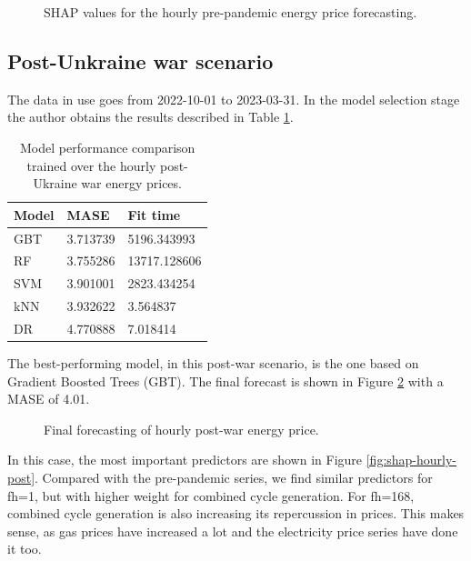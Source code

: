 \begin{figure}[H]
    \caption{SHAP values for the hourly pre-pandemic energy price forecasting.}
    \label{fig:shap-hourly-pre}
\end{figure}

\subsection{Post-Unkraine war scenario}
The data in use goes from 2022-10-01 to 2023-03-31. In the model selection stage the author obtains the results described in Table \ref{tab:cv-hourly-post}.

\begin{table}[H]
\centering
\begin{tabular}{@{}l|l|l@{}}
\toprule
Model & MASE     & Fit time     \\ \midrule
GBT   & 3.713739 & 5196.343993  \\
RF    & 3.755286 & 13717.128606 \\
SVM   & 3.901001 & 2823.434254  \\
kNN   & 3.932622 & 3.564837     \\
DR    & 4.770888 & 7.018414     \\ \bottomrule
\end{tabular}
\caption{Model performance comparison trained over the hourly post-Ukraine war energy prices.}
\label{tab:cv-hourly-post}
\end{table}

The best-performing model, in this post-war scenario, is the one based on Gradient Boosted Trees (GBT). The final forecast is shown in Figure \ref{fig:forecast-hourly-post} with a MASE of 4.01.

\begin{figure}[H]
\centering
    \caption{Final forecasting of hourly post-war energy price.}
    \label{fig:forecast-hourly-post}
\end{figure}

In this case, the most important predictors are shown in Figure \ref{fig:shap-hourly-post}. Compared with the pre-pandemic series, we find similar predictors for fh=1, but with higher weight for combined cycle generation. For fh=168, combined cycle generation is also increasing its repercussion in prices. This makes sense, as gas prices have increased a lot and the electricity price series have done it too.

